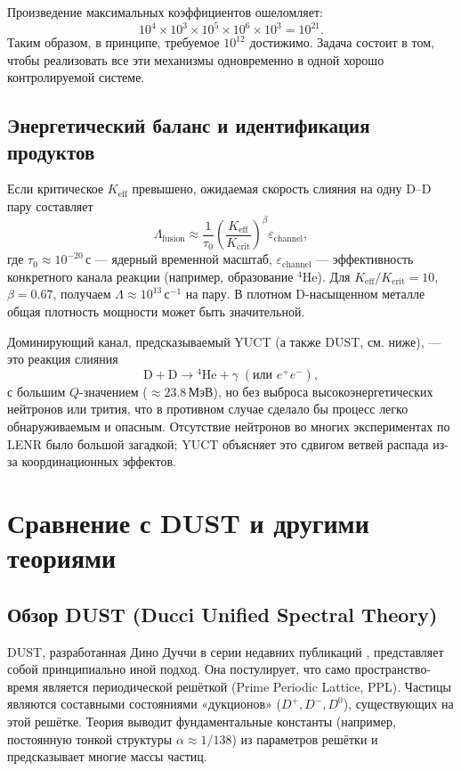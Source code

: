 \documentclass[12pt]{article}
\theoremstyle{remark}
\newcommand{\Keff}{K_{\mathrm{eff}}}
\newcommand{\Kcrit}{K_{\mathrm{crit}}}
\begin{document}
	Произведение максимальных коэффициентов ошеломляет:
	\[
	10^4 \times 10^3 \times 10^5 \times 10^6 \times 10^3 = 10^{21}.
	\]
	Таким образом, в принципе, требуемое \(10^{12}\) достижимо. Задача состоит в том, чтобы реализовать все эти механизмы одновременно в одной хорошо контролируемой системе.
	
	\subsection{Энергетический баланс и идентификация продуктов}
	
	Если критическое \(\Keff\) превышено, ожидаемая скорость слияния на одну D–D пару составляет
	\begin{equation}
		\Lambda_{\text{fusion}} \approx \frac{1}{\tau_0} \left( \frac{\Keff}{\Kcrit} \right)^{\beta} \varepsilon_{\text{channel}},
		\label{eq:fusion-rate}
	\end{equation}
	где \(\tau_0 \approx 10^{-20}\,\text{с}\) — ядерный временной масштаб, \(\varepsilon_{\text{channel}}\) — эффективность конкретного канала реакции (например, образование \(^4\)He). Для \(\Keff/\Kcrit = 10\), \(\beta = 0.67\), получаем \(\Lambda \approx 10^{13}\,\text{с}^{-1}\) на пару. В плотном D-насыщенном металле общая плотность мощности может быть значительной.
	
	Доминирующий канал, предсказываемый YUCT (а также DUST, см. ниже), — это реакция слияния
	\[
	\mathrm{D} + \mathrm{D} \to {}^4\mathrm{He} + \gamma\;(\text{или } e^+e^-),
	\]
	с большим \(Q\)-значением (\(\approx 23.8\,\text{МэВ}\)), но без выброса высокоэнергетических нейтронов или трития, что в противном случае сделало бы процесс легко обнаруживаемым и опасным. Отсутствие нейтронов во многих экспериментах по LENR было большой загадкой; YUCT объясняет это сдвигом ветвей распада из-за координационных эффектов.
	
	\section{Сравнение с DUST и другими теориями}
	\label{sec:comparison}
	
	\subsection{Обзор DUST (Ducci Unified Spectral Theory)}
	
	DUST, разработанная Дино Дуччи в серии недавних публикаций \cite{Ducci2025,Ducci2026a,Ducci2026b}, представляет собой принципиально иной подход. Она постулирует, что само пространство-время является периодической решёткой (Prime Periodic Lattice, PPL). Частицы являются составными состояниями «дукционов» (\(D^+, D^-, D^0\)), существующих на этой решётке. Теория выводит фундаментальные константы (например, постоянную тонкой структуры \(\alpha \approx 1/138\)) из параметров решётки и предсказывает многие массы частиц.
	
\end{document}
